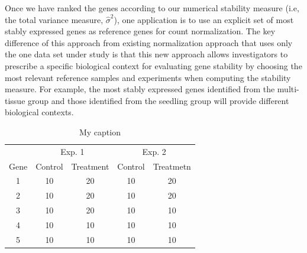 \documentclass[11pt, a4paper]{article}
\begin{document}
Once we have ranked the genes according to our numerical stability measure
(i.e, the total variance measure, $\hat\sigma^2$), one application is to use
an explicit set of most stably expressed genes as reference genes for count
normalization. The key difference of this approach from existing normalization
approach that uses only the one data set under study is that this new approach
allows investigators to prescribe a specific biological context for evaluating
gene stability by choosing the most relevant reference samples and experiments
when computing the stability measure. For example, the most stably expressed
genes identified from the multi-tissue group and those identified from the
seedling group will provide different biological contexts.
	\begin{center}
	    \begin{table}\centering
		\caption{My caption}\label{table:reference}
		\begin{tabular}{ccccc} \\ \hline
		    &  \multicolumn{2}{c}{Exp. 1} & \multicolumn{2}{c}{Exp. 2} \\
		    Gene  & Control & Treatment & Control & Treatmetn \\
		    \hline
		    1     & 10       & 20       & 10    &20   \\
		    2     & 10       & 20       & 10    &20   \\
		    3     & 10       & 20       & 10    &10   \\
		    4     & 10       & 10       & 10    &10   \\ 
		    5     & 10       & 10       & 10    &10   \\  
		\end{tabular}
	    \end{table}
	\end{center}
\end{document}
